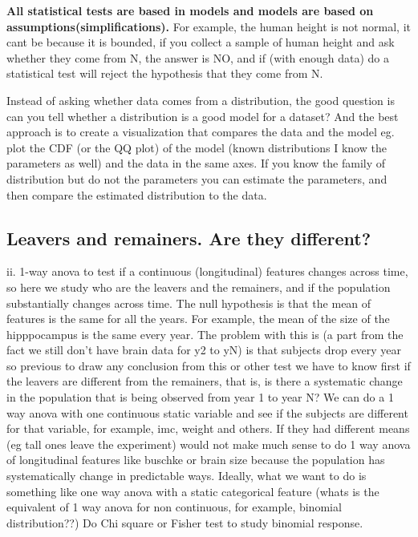 \documentclass[11pt]{article}
\theoremstyle{definition}
\theoremstyle{remark}
\begin{document}
\textbf{All statistical tests are based in models and models are based on assumptions(simplifications).}
For example, the human height is not normal, it cant be because it is bounded, if you collect a sample of human height and ask whether they come from N, the answer is NO, and if (with enough data) do a statistical test will reject the hypothesis that they come from N.

Instead of asking whether data comes from a distribution, the good question is can you tell whether a distribution is a good model for a dataset?
 And the best approach is to create a visualization that compares the data and the model eg. plot the CDF (or the QQ plot) of the model (known distributions I know the parameters as well) and the data in the same axes. If you know the family of distribution but do not the parameters you can estimate the parameters, and then compare the estimated distribution to the data.

\subsection{Leavers and remainers. Are they different?}
\label{sse:res}
ii. 1-way anova to test if a continuous (longitudinal) features changes across time, so here we study who are the leavers and the remainers, and if the population substantially changes across time. The null hypothesis is that the mean of features is the same for all the years. For example, the mean of the size of the hipppocampus is the same every year. The problem with this is (a part from the fact we still don't have brain data for y2 to yN) is that subjects drop every year so previous to draw any conclusion from this or other test we have to know first if the leavers are different from the remainers, that is, is there a systematic change in the population that is being observed from year 1 to year N?
We can do a 1 way anova with one continuous static variable and see if the subjects are different for that variable, for example, imc, weight and others. If they had different means (eg tall ones leave the experiment) would not make much sense to do 1 way anova of longitudinal features like buschke or brain size because the population has systematically change in predictable ways.
Ideally, what we want to do is something like one way anova with a static categorical feature (whats is the equivalent of 1 way anova for non continuous, for example, binomial distribution??) Do Chi square or Fisher test to study binomial response.
\end{document}
